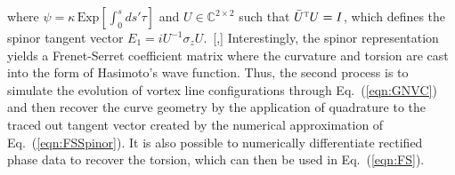 \documentclass[aps,graphicx,reprint,onecolumn,12pt,tightenlines,longbibliography]{revtex4-1}
\begin{document}
where $\psi = \kappa \, \mbox{Exp}\left[ \int_{0}^{s} ds' \tau \right]$ and ${U}\in\mathbb{C}^{2 \times 2}$ such that $\bar{{U}}^{\textsc{t}}  {U}={I}$, which defines the spinor tangent vector ${E}_{1}=i{U}^{-1}{\sigma}_{z} {U}$.~[,]  Interestingly, the spinor representation yields a Frenet-Serret coefficient matrix where the curvature and torsion are cast into the form of Hasimoto's wave function. Thus, the second process is to simulate the evolution of vortex line configurations through  Eq.~(\ref{eqn:GNVC}) and then recover the curve geometry by the application of quadrature to the traced out tangent vector created by the numerical approximation of Eq.~(\ref{eqn:FSSpinor}). It is also possible to numerically differentiate rectified phase data to recover the torsion, which can then be used in Eq.~(\ref{eqn:FS}).
\end{document}
